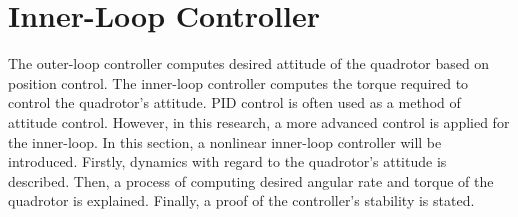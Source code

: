 \section{Inner-Loop Controller}
\label{sec:inner_loop}

The outer-loop controller computes desired attitude of the quadrotor based on position control. The inner-loop controller computes the torque required to control the quadrotor's attitude. PID control is often used as a method of attitude control. However, in this research, a more advanced control is applied for the inner-loop. In this section, a nonlinear inner-loop controller will be introduced. Firstly, dynamics with regard to the quadrotor's attitude is described. Then, a process of computing desired angular rate and torque of the quadrotor is explained. Finally, a proof of the controller's stability is stated.

